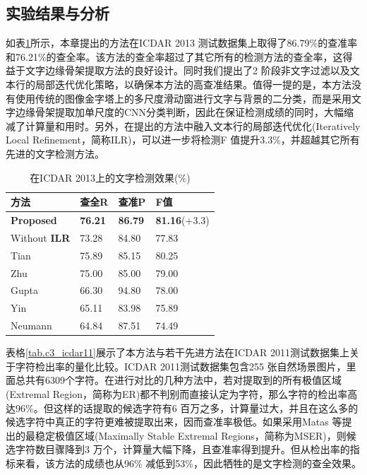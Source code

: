         

        \subsection{实验结果与分析}

        如表\ref{tab.c3_icdar13}所示，本章提出的方法在ICDAR 2013 测试数据集上取得了86.79\%的查准率和76.21\%的查全率。该方法的查全率超过了其它所有的检测方法的查全率，这得益于文字边缘骨架提取方法的良好设计。同时我们提出了2 阶段非文字过滤以及文本行的局部迭代优化策略，以确保本方法的高查准结果。值得一提的是，本方法没有使用传统的图像金字塔上的多尺度滑动窗进行文字与背景的二分类，而是采用文字边缘骨架提取加单尺度的CNN分类判断，因此在保证检测成绩的同时，大幅缩减了计算量和用时。另外，在提出的方法中融入文本行的局部迭代优化(Iteratively Local Refinement，简称ILR)，可以进一步将检测F 值提升3.3\%，并超越其它所有先进的文字检测方法。

        \begin{table}[!h]
        \centering
        \caption{在ICDAR 2013上的文字检测效果(\%)}
        \begin{tabular}{p{}|p{} p{} p{}}
        \hline
        方法 & 查全R & 查准P & F值 \\
        \hline
        \textbf{Proposed} & \textbf{76.21} & \textbf{86.79} & \textbf{81.16}(+3.3) \\
        Without \textbf{ILR} & 73.28 & 84.80 & 77.83 \\
        \hline
        Tian\cite{Tian2016Text} & 75.89 & 85.15 & 80.25 \\
        Zhu\cite{Zhu2016Text} & 75.00 & 85.00 & 79.00 \\
        Gupta\cite{Gupta2016Synthetic} & 66.30 & 94.80 & 78.00 \\
        Yin\cite{Yin2013Robust} & 65.11 & 83.98 & 75.89 \\
        Neumann\cite{Neumann2012Real} & 64.84 & 87.51 & 74.49 \\
        \hline
        \end{tabular}
        \label{tab.c3_icdar13}
        \end{table}

        表格\ref{tab.c3_icdar11}展示了本方法与若干先进方法在ICDAR 2011测试数据集上关于字符检出率的量化比较。ICDAR 2011测试数据集包含255 张自然场景图片，里面总共有6309个字符。在进行对比的几种方法中，若对提取到的所有极值区域(Extremal Region，简称为ER)都不判别而直接认定为字符，那么字符的检出率高达96\%。但这样的话提取的候选字符有6 百万之多，计算量过大，并且在这么多的候选字符中真正的字符更难被提取出来，因而查准率极低。如果采用Matas 等\cite{Matas2004Robust}提出的最稳定极值区域(Maximally Stable Extremal Regions，简称为MSER)，则候选字符数目骤降到3 万个，计算量大幅下降，且查准率得到提升。但从检出率的指标来看，该方法的成绩也从96\% 减低到53\%，因此牺牲的是文字检测的查全效果。

